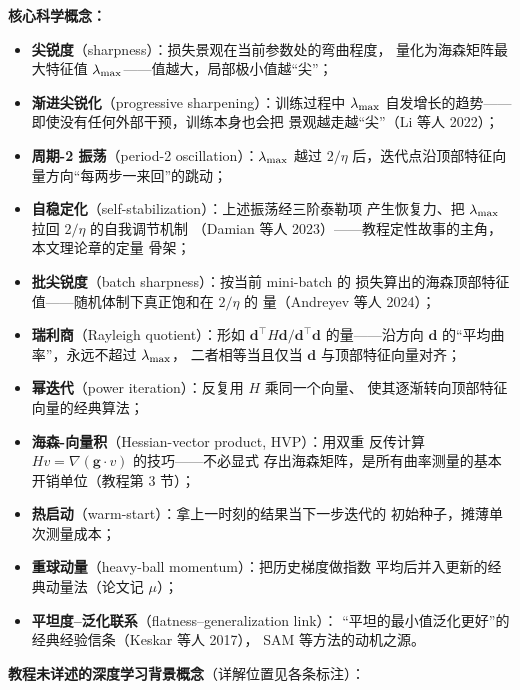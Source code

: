 \textbf{核心科学概念：}

\begin{itemize}
  \item \textbf{尖锐度}（sharpness）：损失景观在当前参数处的弯曲程度，
        量化为海森矩阵最大特征值 $\lambda_{\max}$——值越大，局部极小值越“尖”；
  \item \textbf{渐进尖锐化}（progressive sharpening）：训练过程中
        $\lambda_{\max}$ 自发增长的趋势——即使没有任何外部干预，训练本身也会把
        景观越走越“尖”（Li 等人 2022）；
  \item \textbf{周期-2 振荡}（period-2 oscillation）：$\lambda_{\max}$ 越过
        $2/\eta$ 后，迭代点沿顶部特征向量方向“每两步一来回”的跳动；
  \item \textbf{自稳定化}（self-stabilization）：上述振荡经三阶泰勒项
        产生恢复力、把 $\lambda_{\max}$ 拉回 $2/\eta$ 的自我调节机制
        （Damian 等人 2023）——教程定性故事的主角，本文理论章的定量
        骨架；
  \item \textbf{批尖锐度}（batch sharpness）：按当前 mini-batch 的
        损失算出的海森顶部特征值——随机体制下真正饱和在 $2/\eta$ 的
        量（Andreyev 等人 2024）；
  \item \textbf{瑞利商}（Rayleigh quotient）：形如
        $\mathbf{d}^{\!\top}\!H\mathbf{d}/\mathbf{d}^{\!\top}\!\mathbf{d}$
        的量——沿方向 $\mathbf{d}$ 的“平均曲率”，永远不超过 $\lambda_{\max}$，
        二者相等当且仅当 $\mathbf{d}$ 与顶部特征向量对齐；
  \item \textbf{幂迭代}（power iteration）：反复用 $H$ 乘同一个向量、
        使其逐渐转向顶部特征向量的经典算法；
  \item \textbf{海森-向量积}（Hessian-vector product, HVP）：用双重
        反传计算 $Hv=\nabla(\mathbf{g}\!\cdot\!v)$ 的技巧——不必显式
        存出海森矩阵，是所有曲率测量的基本开销单位（教程第 3 节）；
  \item \textbf{热启动}（warm-start）：拿上一时刻的结果当下一步迭代的
        初始种子，摊薄单次测量成本；
  \item \textbf{重球动量}（heavy-ball momentum）：把历史梯度做指数
        平均后并入更新的经典动量法（论文记 $\mu$）；
  \item \textbf{平坦度--泛化联系}（flatness--generalization link）：
        “平坦的最小值泛化更好”的经典经验信条（Keskar 等人 2017），
        SAM 等方法的动机之源。
\end{itemize}

\textbf{教程未详述的深度学习背景概念}（详解位置见各条标注）：

